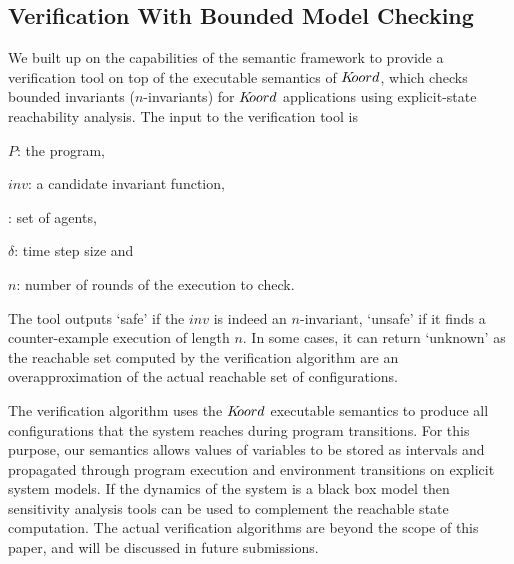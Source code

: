 \subsection{Verification With Bounded Model Checking}
\label{sec:bmc}


We built up on the capabilities of the \K semantic framework to provide a verification tool on top of the executable semantics of $K\kern-2pt oord$, which checks bounded invariants ($n$-invariants) for $K\kern-2pt oord$ applications using explicit-state reachability analysis. The input to the verification tool is 
\begin{inparaenum}[(i)] 
    \item $P$: the program, 
    \item $\mathit{inv}$: a candidate invariant function, 
    \item {\UINS}: set of agents, 
    \item $\delta$: time step size and 
    \item $n$: number of rounds of the execution to check.
\end{inparaenum}

The tool outputs `safe' if the $\mathit{inv}$ is indeed an $n$-invariant, `unsafe' if it finds a counter-example execution of length $n$. In some cases, it can return `unknown' as the reachable set computed by the verification algorithm are an overapproximation of the actual reachable set of configurations.  

The verification algorithm uses the $K\kern-2pt oord$ executable semantics to produce all configurations that the system reaches during program transitions. For this purpose, our semantics allows values of variables to be stored as intervals and propagated through program execution and environment transitions on explicit system models. If the dynamics of the system is a black box model then sensitivity analysis tools can be used to complement the reachable state computation. The actual verification algorithms are beyond the scope of this paper, and will be discussed in future submissions.

